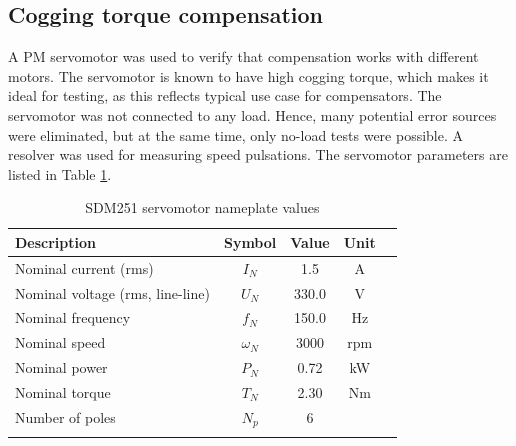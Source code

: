 


\subsection{Cogging torque compensation}
A PM servomotor was used to verify that compensation works with different motors. The servomotor is known to have high cogging torque, which makes it ideal for testing, as this reflects typical use case for compensators. The servomotor was not connected to any load. Hence, many potential error sources were eliminated, but at the same time, only no-load tests were possible. A resolver was used for measuring speed pulsations. The servomotor parameters are listed in Table \ref{Tbl:SDM251}.

\begin{table}[ht]
\caption{SDM251 servomotor nameplate values}
\centering
\begin{tabular}[t]{lcccc}
\hline
Description & Symbol & Value & Unit\\
\hline
Nominal current (rms)  & $I_N$       & 1.5   & A\\
Nominal voltage (rms, line-line) & $U_N$       & 330.0 & V\\
Nominal frequency & $f_N$       & 150.0 & Hz\\
Nominal speed     & $\omega_N$  & 3000  & rpm\\
Nominal power     & $P_N$       & 0.72  & kW\\
Nominal torque    & $T_N$       & 2.30  & Nm\\
Number of poles   & $N_p$       & 6     & \\
\hline
\label{Tbl:SDM251}
\end{tabular}
\end{table}%


